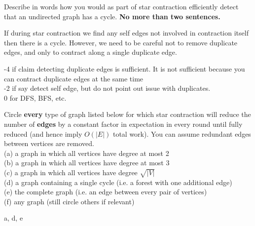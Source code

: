 \begin{cluster}
\label{grp:prb:examii-practice::parallel-cycle-detection}

\begin{problem}
\label{prb:examii-practice::parallel-cycle-detection}


\ask \label{prt-ask:examii-practice::describe}

Describe in words how you would as part of star contraction 
efficiently detect that an undirected graph has a cycle.  \textbf{No more than two sentences.}


\sol \label{cki-sol:examii-practice::star}

If during star contraction we find any self edges not involved in
contraction itself then there is a cycle.   However,
we need to be careful not to remove duplicate edges, and only to
contract along a single duplicate edge.

-4 if claim detecting duplicate edges is sufficient.  It is not sufficient because you can contract duplicate edges at the same time\\
-2 if say detect self edge, but do not point out issue with duplicates.\\
0 for DFS, BFS, etc.

\end{problem}
\end{cluster}

\begin{cluster}
\label{grp:prb:examii-practice::star-contraction}

\begin{problem}
\label{prb:examii-practice::star-contraction}


\ask \label{prt-ask:examii-practice::circle}

Circle \textbf{every} type of graph listed below for which star
contraction will reduce the number of \textbf{edges} by a constant
factor in expectation in every round until fully reduced (and hence
imply $O(|E|)$ total work).  You can assume redundant edges between
vertices are removed.\\

(a) a graph in which all vertices have degree at most 2\\
(b) a graph in which all vertices have degree at most 3\\
(c) a graph in which all vertices have degree $\sqrt{|V|}$\\
(d) a graph containing a single cycle (i.e. a forest with one additional edge)\\
(e) the complete graph (i.e. an edge between every pair of vertices)\\
(f) any graph (still circle others if relevant)\\


\sol \label{cki-sol:examii-practice::_1_}

a, d, e

\end{problem}
\end{cluster}

